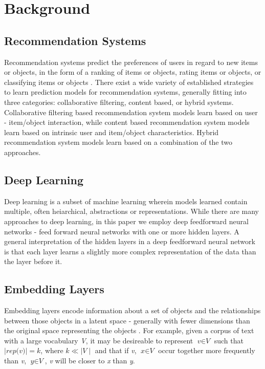 \section{Background}
\subsection{Recommendation Systems}
Recommendation systems predict the preferences of users in regard to new items or objects, in the form of a ranking of items or objects, rating items or objects, or classifying items or objects \cite{DBLP:journals/corr/ZhangYS17aa}. There exist a wide variety of established strategies to learn prediction models for recommendation systems, generally fitting into three categories: collaborative filtering, content based, or hybrid systems. Collaborative filtering based recommendation system models learn based on user - item/object interaction, while content based recommendation system models learn based on intrinsic user and item/object characteristics. Hybrid recommendation system models learn based on a combination of the two approaches.  
\subsection{Deep Learning}
Deep learning is a subset of machine learning wherein models learned contain multiple, often heiarchical, abstractions or representations. While there are many approaches to deep learning, in this paper we employ deep feedforward neural networks - feed forward neural networks with one or more hidden layers. A general interpretation of the hidden layers in a deep feedforward neural network is that each layer learns a slightly more complex representation of the data than the layer before it.
\subsection{Embedding Layers}
Embedding layers encode information about a set of objects and the relationships between those objects in a latent space - generally with fewer dimensions than the original space representing the objects \cite{DBLP:journals/corr/abs-1301-3781}. For example, given a corpus of text with a large vocabulary \textit{V}, it may be desireable to represent $\textit{v}\in\textit{V}$ such that $\mid\textit{rep(v)}\mid=\textit{k}$, where $\textit{k}\ll\mid\textit{V}\mid$ and that if \textit{v}, $\textit{x}\in\textit{V}$ occur together more frequently than \textit{v}, $\textit{y}\in\textit{V}$, \textit{v} will be closer to \textit{x} than \textit{y}.
